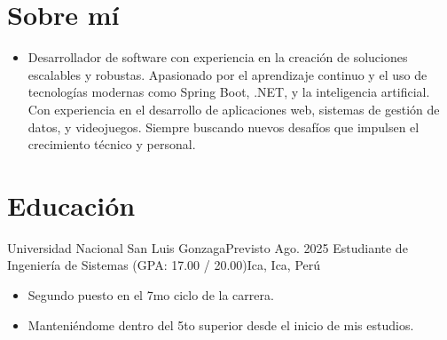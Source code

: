 
\section{Sobre mí}
\noindent\begin{minipage}{\textwidth}
\begin{itemize}[label={}, leftmargin=*]
    \item Desarrollador de software con experiencia en la creación de soluciones escalables y robustas. Apasionado por el aprendizaje continuo y el uso de tecnologías modernas como Spring Boot, .NET, y la inteligencia artificial. Con experiencia en el desarrollo de aplicaciones web, sistemas de gestión de datos, y videojuegos. Siempre buscando nuevos desafíos que impulsen el crecimiento técnico y personal.
\end{itemize}
\end{minipage}

\section{Educación}
\resumeSubHeadingListStart

\resumeSubheading
{Universidad Nacional San Luis Gonzaga}{Previsto Ago. 2025}
{Estudiante de Ingeniería de Sistemas (GPA: 17.00 / 20.00)}{Ica, Ica, Perú}
\begin{itemize}
  \item Segundo puesto en el 7mo ciclo de la carrera.
  \item Manteniéndome dentro del 5to superior desde el inicio de mis estudios.
\end{itemize}

\resumeSubHeadingListEnd